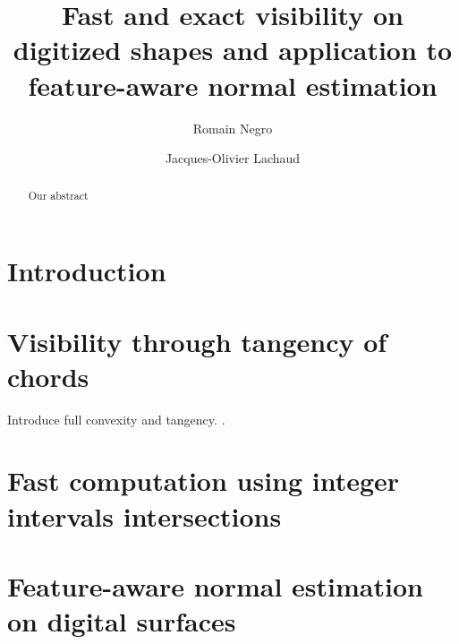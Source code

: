 \documentclass[runningheads]{llncs}
\begin{document}
%
\title{Fast and exact visibility on digitized shapes and application to feature-aware normal estimation}
%
%
\author{Romain Negro \and
  Jacques-Olivier Lachaud}
%
%
%
\maketitle              %
%
\begin{abstract}
  Our abstract
\end{abstract}

\section{Introduction}

\section{Visibility through tangency of chords}

Introduce full convexity and tangency. \cite{lachaud:2021-dgmm,Lachaud:2022-jmiv}.

\section{Fast computation using integer intervals intersections}

\section{Feature-aware normal estimation on digital surfaces}
\end{document}
